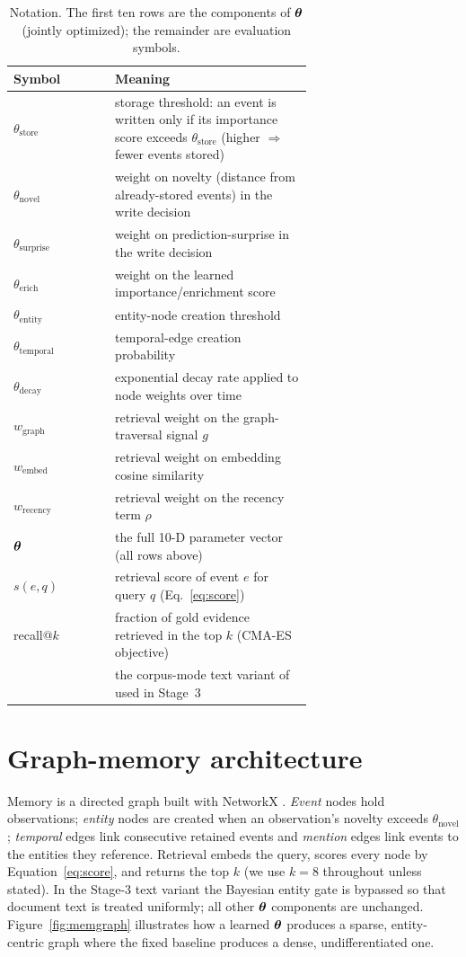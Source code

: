 \begin{table}[t]
\centering
\caption{Notation. The first ten rows are the components of $\boldsymbol{\theta}$ (jointly
optimized); the remainder are evaluation symbols.}
\label{tab:notation}
\small
\begin{tabular}{l p{0.66\linewidth}}
\toprule
Symbol & Meaning \\
\midrule
$\theta_{\mathrm{store}}$ & storage threshold: an event is written only if its importance score exceeds $\theta_{\mathrm{store}}$ (higher $\Rightarrow$ fewer events stored) \\
$\theta_{\mathrm{novel}}$ & weight on novelty (distance from already-stored events) in the write decision \\
$\theta_{\mathrm{surprise}}$ & weight on prediction-surprise in the write decision \\
$\theta_{\mathrm{erich}}$ & weight on the learned importance/enrichment score \\
$\theta_{\mathrm{entity}}$ & entity-node creation threshold \\
$\theta_{\mathrm{temporal}}$ & temporal-edge creation probability \\
$\theta_{\mathrm{decay}}$ & exponential decay rate applied to node weights over time \\
$w_{\mathrm{graph}}$ & retrieval weight on the graph-traversal signal $g$ \\
$w_{\mathrm{embed}}$ & retrieval weight on embedding cosine similarity \\
$w_{\mathrm{recency}}$ & retrieval weight on the recency term $\rho$ \\
\midrule
$\boldsymbol{\theta}$ & the full 10-D parameter vector (all rows above) \\
$s(e,q)$ & retrieval score of event $e$ for query $q$ (Eq.~\ref{eq:score}) \\
recall@$k$ & fraction of gold evidence retrieved in the top $k$ (CMA-ES objective) \\
\Vt{} & the corpus-mode text variant of \Vfour{} used in Stage~3 \\
\bottomrule
\end{tabular}
\end{table}

\section{Graph-memory architecture}
\label{sec:graphmem}
Memory is a directed graph built with NetworkX \citep{hagberg2008networkx}.
\emph{Event} nodes hold observations; \emph{entity} nodes are created when an
observation's novelty exceeds $\theta_{\mathrm{novel}}$; \emph{temporal} edges
link consecutive retained events and \emph{mention} edges link events to the
entities they reference. Retrieval embeds the query, scores every node by
Equation~\eqref{eq:score}, and returns the top $k$ (we use $k=8$ throughout
unless stated). In the Stage-3 text variant \Vt{} the Bayesian entity gate is
bypassed so that document text is treated
uniformly; all other $\boldsymbol{\theta}$ components are unchanged.
Figure~\ref{fig:memgraph} illustrates how a learned $\boldsymbol{\theta}$ produces a
sparse, entity-centric graph where the fixed baseline produces a dense,
undifferentiated one.

